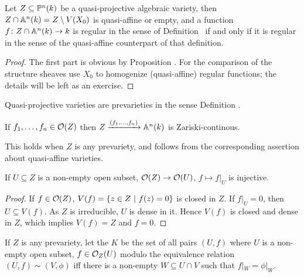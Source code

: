 \documentclass[a4paper,parskip=half,numbers=enddot, DIV=12]{scrreprt}
\begin{document}
\begin{prop}
    Let $Z\subseteq \mathbb{P}^n(k)$ be a quasi-projective algebraic variety, then $Z\cap \mathbb{A}^n(k) = Z \setminus V(X_0)$ is quasi-affine or empty, and a function $f\colon Z\cap \IA^n(k)\morphism k$ is regular in the sense of Definition~ if and only if it is regular in the sense of the quasi-affine counterpart of that definition. 
\end{prop}
\begin{proof}
    The first part is obvious by Proposition . For the comparison of the structure sheaves use $X_0$ to homogenize (quasi-affine) regular functions; the details will be left as an exercise.
\end{proof}
\begin{cor*}
    Quasi-projective varieties are prevarieties in the sense Definition .
\end{cor*}
\begin{cor}
    If $f_1,\ldots, f_n\in \mathcal{O}(Z)$ then $Z\xrightarrow{(f_1,\ldots, f_n)}\mathbb{A}^n(k)$ is Zariski-continous.
\end{cor}
\begin{rem*}
    This holds when $Z$ is any prevariety, and follows from the corresponding assertion about quasi-affine varieties.
\end{rem*}
\begin{cor}
    If $U\subseteq Z$ is a non-empty open subset, $\Oo(Z)\morphism \Oo(U)$, $f\mapsto f|_U$ is injective.
\end{cor}
\begin{proof}
    If $f\in \mathcal{O}(Z)$, $V(f) = \left\{z\in Z\ \middle|\  f(z)=0\right\}$ is closed in $Z$. If $f|_U=0$, then $U\subseteq V(f)$. As $Z$ is irreducible, $U$ is dense in it. Hence $V(f)$ is closed and dense in $Z$, which implies $V(f)=Z$ and $f=0$.
\end{proof}
\begin{defi}
    If $Z$ is any prevariety, let the  $K$ be the set of all pairs $(U,f)$ where $U$ is a non-empty open subset, $f\in\mathcal{O}_Z(U)$ modulo the equivalence relation $(U,f)\sim (V,\phi)$ iff there is a non-empty $W\subseteq U\cap V$ such that $f|_W= \phi|_W$.
\end{defi}
\end{document}
